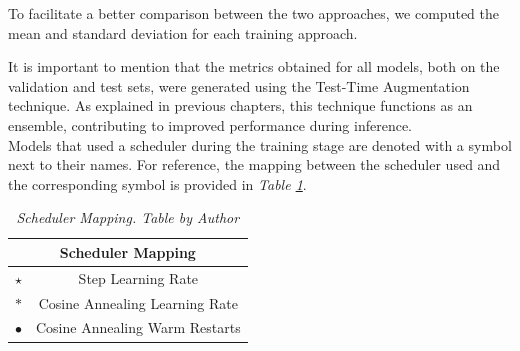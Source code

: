 To facilitate a better comparison between the two approaches,
we computed the mean and standard deviation for each training approach.

\newpage

It is important to mention that the metrics obtained for all models,
both on the validation and test sets, were generated using the Test-Time Augmentation technique.
As explained in previous chapters, this technique functions as an ensemble, contributing to improved performance during inference. \\

Models that used a scheduler during the training stage are denoted with a symbol next to their names.
For reference, the mapping between the scheduler used and the corresponding symbol is provided in \textit{Table \ref{table:scheduler-mapping}}.

\begin{table}[H]
	\centering
	\begin{tabular}{cc}
		\toprule
		\multicolumn{2}{c}{\textbf{Scheduler Mapping}} \\
		\midrule
		$\star$     & Step Learning Rate \\
		$\ast$      & Cosine Annealing Learning Rate \\
	  $\bullet$   & Cosine Annealing Warm Restarts \\
		\bottomrule
	\end{tabular}
  \caption[Scheduler Mapping]
  {\textit{Scheduler Mapping.
  Table by Author}}
	\label{table:scheduler-mapping}
\end{table}

\newpage

